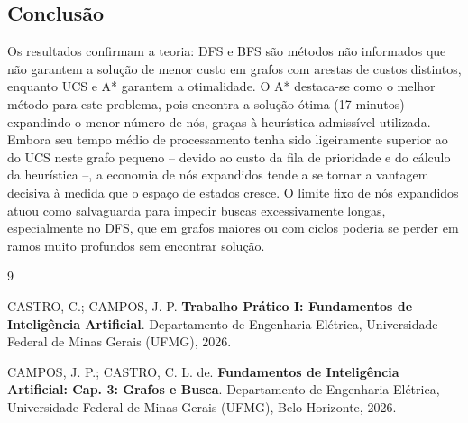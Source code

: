 \documentclass{article}
\begin{document}
\subsection{Conclusão}

Os resultados confirmam a teoria: DFS e BFS são métodos não informados
que não garantem a solução de menor custo em grafos com arestas de
custos distintos, enquanto UCS e A* garantem a otimalidade. O A*
destaca-se como o melhor método para este problema, pois encontra a
solução ótima (17 minutos) expandindo o menor número de nós, graças
à heurística admissível utilizada. Embora seu tempo médio de
processamento tenha sido ligeiramente superior ao do UCS neste grafo
pequeno -- devido ao custo da fila de prioridade e do cálculo da
heurística --, a economia de nós expandidos tende a se tornar a
vantagem decisiva à medida que o espaço de estados cresce. O limite fixo de nós expandidos
atuou como salvaguarda para impedir buscas excessivamente longas,
especialmente no DFS, que em grafos maiores ou com ciclos poderia
se perder em ramos muito profundos sem encontrar solução.

\renewcommand{\refname}{Referências Bibliográficas}
\begin{thebibliography}{9}

CASTRO, C.; CAMPOS, J. P. \textbf{Trabalho Prático I: Fundamentos de Inteligência Artificial}. Departamento de Engenharia Elétrica, Universidade Federal de Minas Gerais (UFMG), 2026.

CAMPOS, J. P.; CASTRO, C. L. de. \textbf{Fundamentos de Inteligência Artificial: Cap. 3: Grafos e Busca}. Departamento de Engenharia Elétrica, Universidade Federal de Minas Gerais (UFMG), Belo Horizonte, 2026.

\end{thebibliography}
\end{document}
